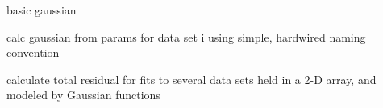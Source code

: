 \documentclass[letterpaper,10pt,english]{sphinxmanual}
\begin{document}

\begin{fulllineitems}
\label{\detokenize{platelib:platelib.fitfun.gauss}}
basic gaussian

\end{fulllineitems}


\begin{fulllineitems}
\label{\detokenize{platelib:platelib.fitfun.gauss_dataset}}
calc gaussian from params for data set i
using simple, hardwired naming convention

\end{fulllineitems}


\begin{fulllineitems}
\label{\detokenize{platelib:platelib.fitfun.linear}}
\end{fulllineitems}


\begin{fulllineitems}
\label{\detokenize{platelib:platelib.fitfun.objective}}
calculate total residual for fits to several data sets held
in a 2-D array, and modeled by Gaussian functions

\end{fulllineitems}


\begin{fulllineitems}
\label{\detokenize{platelib:platelib.fitfun.quadratic}}
\end{fulllineitems}
\end{document}
